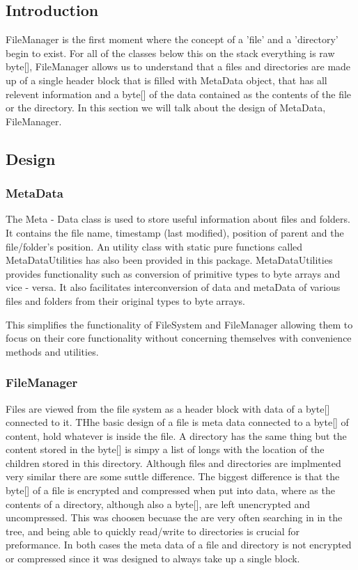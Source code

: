 \documentclass[12pt]{article}
\begin{document}
\subsection{Introduction}
FileManager is the first moment where the concept of a 'file' and a 'directory' begin to exist.  For all of the classes below this on the stack everything is raw byte[], FileManager allows us to understand that a files and directories are made up of a single header block that is filled with MetaData object, that has all relevent information and a byte[] of the data contained as the contents of the file or the directory.  In this section we will talk about the design of MetaData, FileManager.
\subsection{Design}
\subsubsection{MetaData}
The Meta - Data class is used to store useful information about files and folders. It contains the file name, timestamp (last modified), position of parent and the file/folder's position. An utility class with static pure functions called MetaDataUtilities has also been provided in this package. MetaDataUtilities provides functionality such as conversion of primitive types to byte arrays and vice - versa. It also facilitates interconversion of data and metaData of various files and folders from their original types to byte arrays. 

This simplifies the functionality of FileSystem and FileManager allowing them to focus on their core functionality without concerning themselves  with convenience methods and utilities.

\subsubsection{FileManager}

Files are viewed from the file system as a header block with data of a byte[] connected to it.  THhe basic design of a file is meta data connected to a byte[] of content, hold whatever is inside the file.  A directory has the same thing but the content stored in the byte[] is simpy a list of longs with the location of the children stored in this directory.  Although files and directories are implmented very similar there are some suttle difference.  The biggest difference is that the byte[] of a file is encrypted and compressed when put into data, where as the contents of a directory, although also a byte[], are left unencrypted and uncompressed.  This was choosen becuase the are very often searching in in the tree, and being able to quickly read/write to directories is crucial for preformance.  In both cases the meta data of a file and directory is not encrypted or compressed since it was designed to always take up a single block.
\end{document}
